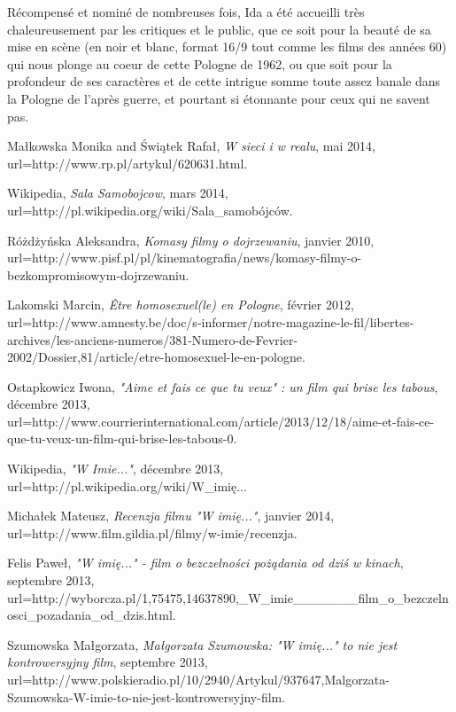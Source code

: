 \documentclass[12pt]{amsart}
\begin{document}
Récompensé et nominé de nombreuses fois, Ida a été accueilli très chaleureusement par les critiques et le public, que ce soit pour la beauté de sa mise en scène (en noir et blanc, format 16/9 tout comme les films des années 60) qui nous plonge au coeur de cette Pologne de 1962, ou que soit pour la profondeur de ses caractères et de cette intrigue somme toute assez banale dans la Pologne de l'après guerre, et pourtant si étonnante pour ceux qui ne savent pas. 

\clearpage
\begin{thebibliography}{100}

	Małkowska Monika and Świątek Rafał,
	\emph{W sieci i w realu},
	mai 2014,
	url=http://www.rp.pl/artykul/620631.html.

	Wikipedia,
	\emph{Sala Samobojcow},
	mars 2014,
	url=http://pl.wikipedia.org/wiki/Sala\_samobójców.


	Różdżyńska Aleksandra,
	\emph{Komasy filmy o dojrzewaniu},
	janvier 2010,
	url=http://www.pisf.pl/pl/kinematografia/news/komasy-filmy-o-bezkompromisowym-dojrzewaniu.


	Lakomski Marcin,
	\emph{Être homosexuel(le) en Pologne},
	février 2012,
	url=http://www.amnesty.be/doc/s-informer/notre-magazine-le-fil/libertes-archives/les-anciens-numeros/381-Numero-de-Fevrier-2002/Dossier,81/article/etre-homosexuel-le-en-pologne.

	Ostapkowicz Iwona,
	\emph{"Aime et fais ce que tu veux" : un film qui brise les tabous},
	décembre 2013,
	url=http://www.courrierinternational.com/article/2013/12/18/aime-et-fais-ce-que-tu-veux-un-film-qui-brise-les-tabous-0.

	Wikipedia,
	\emph{"W Imie..."},
	décembre 2013,
	url=http://pl.wikipedia.org/wiki/W\_imię...

	Michałek Mateusz,
	\emph{Recenzja filmu "W imię..."},
	janvier 2014,
	url=http://www.film.gildia.pl/filmy/w-imie/recenzja.

	Felis Paweł,
	\emph{"W imię..." - film o bezczelności pożądania od dziś w kinach},
	septembre 2013,
	url=http://wyborcza.pl/1,75475,14637890,\_W\_imie\_\_\_\_\_\_\_film\_o\_bezczelnosci\_pozadania\_od\_dzis.html.


	Szumowska Małgorzata,
	\emph{Małgorzata Szumowska: "W imię..." to nie jest kontrowersyjny film},
	septembre 2013,
	url=http://www.polskieradio.pl/10/2940/Artykul/937647,Malgorzata-Szumowska-W-imie-to-nie-jest-kontrowersyjny-film.


\end{thebibliography}
\end{document}
